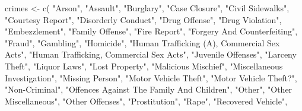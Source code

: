 \documentclass[
  12pt,
  openany]{book}
\newenvironment{Shaded}{\begin{snugshade}}{\end{snugshade}}
\newcommand{\FunctionTok}[1]{\textcolor[rgb]{0,0,0}{#1}}
\newcommand{\NormalTok}[1]{#1}
\newcommand{\OtherTok}[1]{\textcolor[rgb]{0.37,0.37,0.37}{#1}}
\newcommand{\StringTok}[1]{\textcolor[rgb]{0.5,0.5,0.5}{#1}}
\begin{document}
\begin{Shaded}
\begin{Highlighting}[]
\NormalTok{crimes }\OtherTok{\textless{}{-}} \FunctionTok{c}\NormalTok{(}
  \StringTok{"Arson"}\NormalTok{,}
  \StringTok{"Assault"}\NormalTok{,                                  }
  \StringTok{"Burglary"}\NormalTok{,                                 }
  \StringTok{"Case Closure"}\NormalTok{,                             }
  \StringTok{"Civil Sidewalks"}\NormalTok{,                          }
  \StringTok{"Courtesy Report"}\NormalTok{,                          }
  \StringTok{"Disorderly Conduct"}\NormalTok{,                       }
  \StringTok{"Drug Offense"}\NormalTok{,                             }
  \StringTok{"Drug Violation"}\NormalTok{,                           }
  \StringTok{"Embezzlement"}\NormalTok{,                             }
  \StringTok{"Family Offense"}\NormalTok{,                           }
  \StringTok{"Fire Report"}\NormalTok{,                              }
  \StringTok{"Forgery And Counterfeiting"}\NormalTok{,               }
  \StringTok{"Fraud"}\NormalTok{,                                    }
  \StringTok{"Gambling"}\NormalTok{,                                 }
  \StringTok{"Homicide"}\NormalTok{,                                 }
  \StringTok{"Human Trafficking (A), Commercial Sex Acts"}\NormalTok{,}
  \StringTok{"Human Trafficking, Commercial Sex Acts"}\NormalTok{,   }
  \StringTok{"Juvenile Offenses"}\NormalTok{,                        }
  \StringTok{"Larceny Theft"}\NormalTok{,                            }
  \StringTok{"Liquor Laws"}\NormalTok{,                              }
  \StringTok{"Lost Property"}\NormalTok{,                            }
  \StringTok{"Malicious Mischief"}\NormalTok{,                       }
  \StringTok{"Miscellaneous Investigation"}\NormalTok{,              }
  \StringTok{"Missing Person"}\NormalTok{,                           }
  \StringTok{"Motor Vehicle Theft"}\NormalTok{,                      }
  \StringTok{"Motor Vehicle Theft?"}\NormalTok{,                     }
  \StringTok{"Non{-}Criminal"}\NormalTok{,                             }
  \StringTok{"Offences Against The Family And Children"}\NormalTok{, }
  \StringTok{"Other"}\NormalTok{,                                    }
  \StringTok{"Other Miscellaneous"}\NormalTok{,                      }
  \StringTok{"Other Offenses"}\NormalTok{,                           }
  \StringTok{"Prostitution"}\NormalTok{,                             }
  \StringTok{"Rape"}\NormalTok{,                                     }
  \StringTok{"Recovered Vehicle"}\NormalTok{,                        }

\end{Highlighting}
\end{Shaded}
\end{document}
